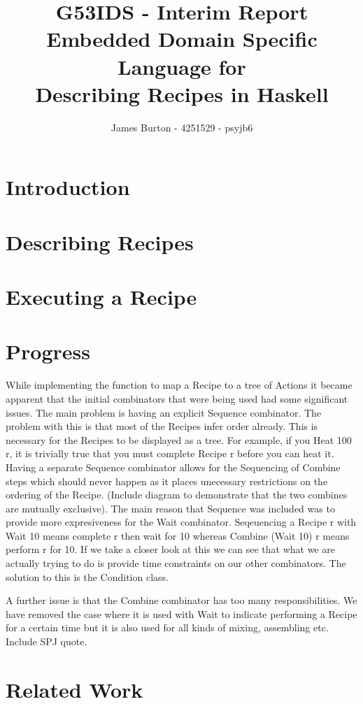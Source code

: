 \documentclass[11pt]{article}
\title
{ 
    G53IDS - Interim Report \\
    \hfill \break
    \large Embedded Domain Specific Language for \\
    Describing Recipes in Haskell
}
\author{James Burton - 4251529 - psyjb6}
\begin{document}
    \maketitle
    \newpage

    \tableofcontents
    \newpage

    \section{Introduction}

    \section{Describing Recipes}

    \section{Executing a Recipe}

    \section{Progress}
    While implementing the function to map a Recipe to a tree of Actions it became apparent that the initial
    combinators that were being used had some significant issues. The main problem is having an explicit Sequence
    combinator. The problem with this is that most of the Recipes infer order already. This is necessary for the
    Recipes to be displayed as a tree. For example, if you Heat 100 r, it is trivially true that you must complete
    Recipe r before you can heat it. Having a separate Sequence combinator allows for the Sequencing of Combine steps
    which should never happen as it places unecessary restrictions on the ordering of the Recipe. (Include diagram
    to demonstrate that the two combines are mutually exclusive). The main reason that Sequence was included was to
    provide more expresiveness for the Wait combinator. Seqeuencing a Recipe r with Wait 10 means complete r then
    wait for 10 whereas Combine (Wait 10) r means perform r for 10. If we take a closer look at this we can see that
    what we are actually trying to do is provide time constraints on our other combinators. The solution to this is
    the Condition class.
    
    A further issue is that the Combine combinator has too many responsibilities. We have removed the case where it
    is used with Wait to indicate performing a Recipe for a certain time but it is also used for all kinds of mixing,
    assembling etc. Include SPJ quote. 

    \section{Related Work}

    \newpage
    \begin{thebibliography}{0}
        
    \end{thebibliography}   
     
\end{document}
